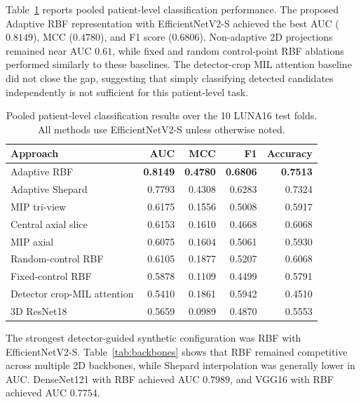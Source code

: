 \documentclass[preprint,12pt]{elsarticle}
\begin{document}
Table~\ref{tab:main_results} reports pooled patient-level classification performance. The proposed Adaptive RBF representation with EfficientNetV2-S achieved the best AUC ($0.8149$), MCC ($0.4780$), and F1 score ($0.6806$). Non-adaptive 2D projections remained near AUC $0.61$, while fixed and random control-point RBF ablations performed similarly to these baselines. The detector-crop MIL attention baseline did not close the gap, suggesting that simply classifying detected candidates independently is not sufficient for this patient-level task.

\begin{table}[t]
\centering
\caption{Pooled patient-level classification results over the 10 LUNA16 test folds. All methods use EfficientNetV2-S unless otherwise noted.}
\label{tab:main_results}
\small
\begin{tabular}{lrrrr}
\toprule
Approach & AUC & MCC & F1 & Accuracy \\
\midrule
Adaptive RBF & \textbf{0.8149} & \textbf{0.4780} & \textbf{0.6806} & \textbf{0.7513} \\
Adaptive Shepard & 0.7793 & 0.4308 & 0.6283 & 0.7324 \\
MIP tri-view & 0.6175 & 0.1556 & 0.5008 & 0.5917 \\
Central axial slice & 0.6153 & 0.1610 & 0.4668 & 0.6068 \\
MIP axial & 0.6075 & 0.1604 & 0.5061 & 0.5930 \\
Random-control RBF & 0.6105 & 0.1877 & 0.5207 & 0.6068 \\
Fixed-control RBF & 0.5878 & 0.1109 & 0.4499 & 0.5791 \\
Detector crop-MIL attention & 0.5410 & 0.1861 & 0.5942 & 0.4510 \\
3D ResNet18 & 0.5659 & 0.0989 & 0.4870 & 0.5553 \\
\bottomrule
\end{tabular}
\end{table}

The strongest detector-guided synthetic configuration was RBF with EfficientNetV2-S. Table~\ref{tab:backbones} shows that RBF remained competitive across multiple 2D backbones, while Shepard interpolation was generally lower in AUC. DenseNet121 with RBF achieved AUC $0.7989$, and VGG16 with RBF achieved AUC $0.7754$.
\end{document}
